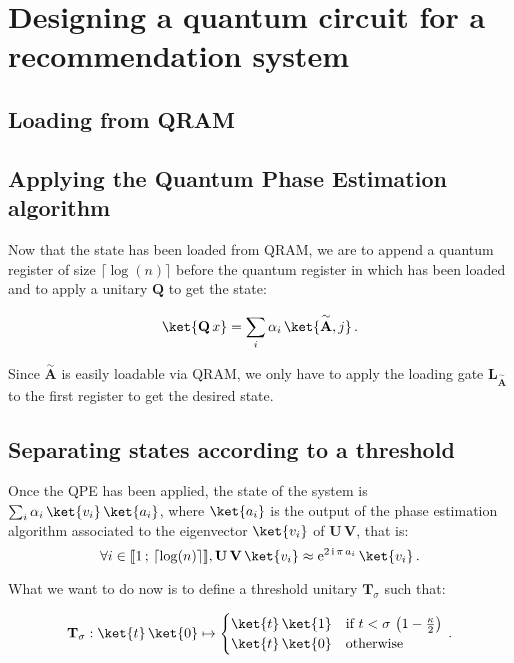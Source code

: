 \documentclass[11pt, a4paper]{article}
\begin{document}
    \section{Designing a quantum circuit for a recommendation system}
        \label{sec:QCircuit}
        \subsection{Loading from QRAM}
        \subsection{Applying the Quantum Phase Estimation algorithm}
            Now that the state  has been loaded from QRAM, we are to append a quantum register of size \(\lceil\log(n)\rceil\) before the quantum register in which  has been loaded and to apply a unitary \(\mathbf{Q}\) to get the state:
            
            \[\ket{\mathbf{Q}\,x}=\sum_i\alpha_i\,\ket{\overset{\sim}{\mathbf{A}}, j}\,.\]
            
            Since \(\overset{\sim}{\mathbf{A}}\) is easily loadable via QRAM, we only have to apply the loading gate \(\mathbf{L}_{\overset{\sim}{\mathbf{A}}}\) to the first register to get the desired state.
            
        \subsection{Separating states according to a threshold}
            Once the QPE has been applied, the state of the system is \(\sum_i\alpha_i\,\ket{v_i}\,\ket{a_i}\), where \(\ket{a_i}\) is the output of the phase estimation algorithm associated to the eigenvector \(\ket{v_i}\) of \(\mathbf{U}\,\mathbf{V}\), that is:
            \[\forall i\in\llbracket1\,;\,\lceil\log(n)\rceil\rrbracket,\mathbf{U}\,\mathbf{V}\,\ket{v_i}\approx\mathrm{e}^{2\,\mathrm{i}\,\pi\,a_i}\,\ket{v_i}\,.\]
            
            What we want to do now is to define a threshold unitary \(\mathbf{T}_\sigma\) such that:
            
            \[\mathbf{T}_\sigma:\ket{t}\,\ket{0}\mapsto\begin{cases}\ket{t}\,\ket{1} &\text{if } t < \sigma\,\left(1-\frac\kappa2\right)\\\ket{t}\,\ket{0}&\text{otherwise}\end{cases}\,.\]
            
\end{document}
